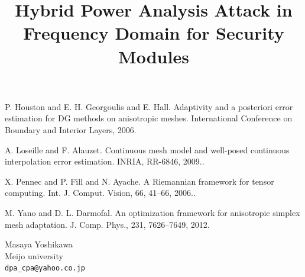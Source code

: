 \documentclass[article, A4, 11pt]{llncs}%
\begin{document}

\begin{thebibliography}{10}
{\sc P. Houston and E. H. Georgoulis and E. Hall}. {Adaptivity   and a posteriori error estimation for {DG} methods on anisotropic   meshes}. International Conference on Boundary and Interior Layers,   2006.

{\sc  A. Loseille and F. Alauzet}. {Continuous mesh model and   well-posed continuous interpolation error estimation}. INRIA,   RR-6846, 2009..

{\sc X. Pennec and P. Fill and N. Ayache}. {A Riemannian   framework for tensor computing}. Int. J. Comput. Vision, 66, 41--66, 2006..

{\sc  M. Yano and D. L. Darmofal}. {An optimization framework   for anisotropic simplex mesh adaptation}. J. Comp. Phys., 231,   7626--7649, 2012.
\end{thebibliography} %

\title{Hybrid Power Analysis Attack in Frequency Domain for Security Modules}
 \author{} \institute{}
\maketitle
\begin{center}
{\large Masaya Yoshikawa}\\
Meijo university\\
{\tt dpa\_cpa@yahoo.co.jp}
\end{center}
\end{document}
